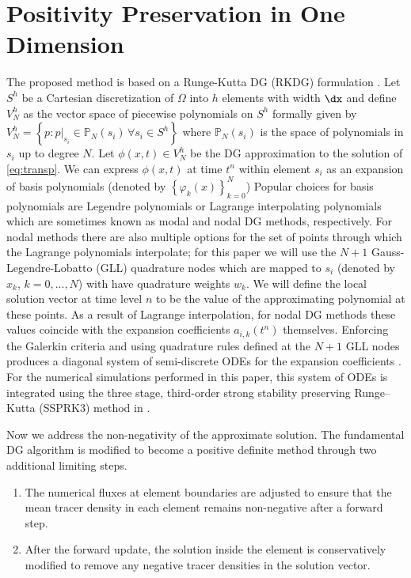 \documentclass{ametsoc}
\begin{document}
\section{Positivity Preservation in One Dimension} \label{sec:pp1d}

The proposed method is based on a Runge-Kutta DG (RKDG) formulation \cite{Hesthaven:2007aa,durran2010numerical, Lauritzen:2011aa}. Let $S^h$ be a Cartesian discretization of $\Omega$ into $h$ elements with width $\dx$ and define $V_N^h$ as the vector space of piecewise polynomials on $S^h$ formally given by $V_N^h = \left\{ p : p\big|_{s_i} \in \mathbb{P}_N(s_i) \, \forall s_i \in S^h \right\}$ where $\mathbb{P}_N(s_i)$ is the space of polynomials in $s_i$ up to degree $N$. Let $\phi(x,t) \in V_N^h$ be the DG approximation to the solution of \eqref{eq:transp}. We can express $\phi(x,t)$ at time $t^n$ within element $s_i$ as an expansion of basis polynomials (denoted by $\left\{ \varphi_k(x) \right\}_{k=0}^N$)
Popular choices for basis polynomials are Legendre polynomials or Lagrange interpolating polynomials which are sometimes known as modal and nodal DG methods, respectively. For nodal methods there are also multiple options for the set of points through which the Lagrange polynomials interpolate; for this paper we will use the $N+1$ Gauss-Legendre-Lobatto (GLL) quadrature nodes which are mapped to $s_i$ (denoted by $x_k$, $k=0,...,N$) with have quadrature weights $w_k$. We will define the local solution vector at time level $n$ to be the value of the approximating polynomial at these points. As a result of Lagrange interpolation, for nodal DG methods these values coincide with the expansion coefficients $a_{i,k}(t^n)$ themselves. Enforcing the Galerkin criteria and using quadrature rules defined at the $N+1$ GLL nodes produces a diagonal system of semi-discrete ODEs for the expansion coefficients \cite{durran2010numerical}. For the numerical simulations performed in this paper, this system of ODEs is integrated using the three stage, third-order strong stability preserving Runge--Kutta (SSPRK3) method in \cite{Gottlieb:2009aa}. 

Now we address the non-negativity of the approximate solution. The fundamental DG algorithm is modified to become a positive definite method through two additional limiting steps. 
\begin{enumerate}
\item The numerical fluxes at element boundaries are adjusted to ensure that the mean tracer density in each element remains non-negative after a forward step.
\item After the forward update, the solution inside the element is conservatively modified to remove any negative tracer densities in the solution vector.
\end{enumerate}
\end{document}
